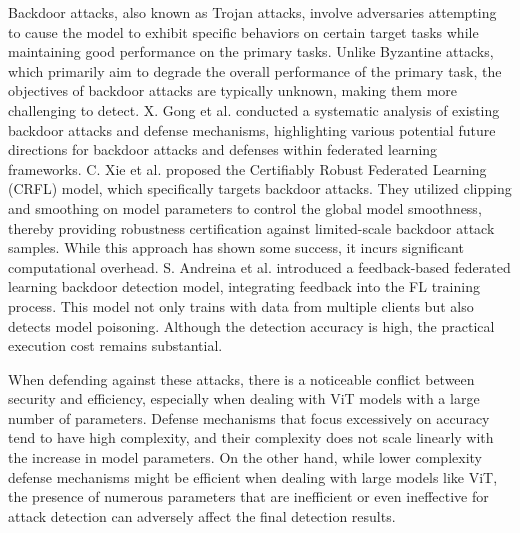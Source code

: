 \documentclass[conference]{IEEEtran}
\begin{document}
Backdoor attacks, also known as Trojan attacks, involve adversaries attempting to cause the model to exhibit specific behaviors on certain target tasks while maintaining good performance on the primary tasks\cite{canYouBackdoor}. Unlike Byzantine attacks, which primarily aim to degrade the overall performance of the primary task, the objectives of backdoor attacks are typically unknown, making them more challenging to detect. X. Gong et al. conducted a systematic analysis of existing backdoor attacks and defense mechanisms, highlighting various potential future directions for backdoor attacks and defenses within federated learning frameworks\cite{backdoorAndDefense}. C. Xie et al. proposed the Certifiably Robust Federated Learning (CRFL) model, which specifically targets backdoor attacks. They utilized clipping and smoothing on model parameters to control the global model smoothness, thereby providing robustness certification against limited-scale backdoor attack samples\cite{backdoorAndDefense_robust}. While this approach has shown some success, it incurs significant computational overhead. S. Andreina et al. introduced a feedback-based federated learning backdoor detection model, integrating feedback into the FL training process. This model not only trains with data from multiple clients but also detects model poisoning\cite{backdoorAndDefense_feedback}. Although the detection accuracy is high, the practical execution cost remains substantial\cite{MrZhou_MSFL}.


When defending against these attacks, there is a noticeable conflict between security and efficiency, especially when dealing with ViT models with a large number of parameters. Defense mechanisms that focus excessively on accuracy tend to have high complexity, and their complexity does not scale linearly with the increase in model parameters. On the other hand, while lower complexity defense mechanisms might be efficient when dealing with large models like ViT, the presence of numerous parameters that are inefficient or even ineffective for attack detection can adversely affect the final detection results.

\end{document}
